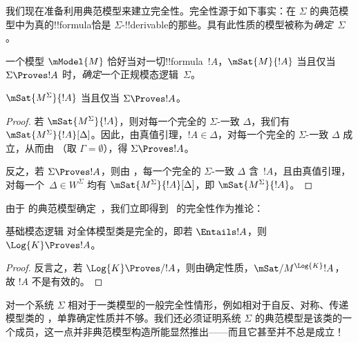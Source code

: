 \documentclass[../../../include/open-logic-section]{subfiles}
\begin{document}


我们现在准备利用典范模型来建立完全性。完全性源于如下事实：在 $\Sigma$ 的典范模型中为真的!!{formula}恰是 $\Sigma$-!!{derivable}的那些。具有此性质的模型被称为\emph{确定}~$\Sigma$。

\begin{defn}
  一个模型 $\mModel{M}$ 恰好当对一切!!{formula}~$!A$，$\mSat{M}{!A}$ 当且仅当 $\Sigma \Proves !A$ 时，\emph{确定}一个正规模态逻辑~$\Sigma$。
\end{defn}

\begin{thm}[确定]
   $\mSat{M^\Sigma}{!A}$ 当且仅当 $\Sigma \Proves !A$。
\end{thm}

\begin{proof}
  若 $\mSat{M^\Sigma}{!A}$，则对每一个完全的 $\Sigma$-一致 $\Delta$，我们有 $\mSat{M^\Sigma}{!A}[\Delta]$。因此，由真值引理，$!A \in \Delta$，对每一个完全的 $\Sigma$-一致 $\Delta$ 成立，从而由 （取 $\Gamma = \emptyset$），得 $\Sigma \Proves !A$。

  反之，若 $\Sigma \Proves !A$，则由 ，每一个完全的 $\Sigma$-一致 $\Delta$ 含~$!A$，且由真值引理，对每一个~$\Delta \in W^\Sigma$ 均有 $\mSat{M^\Sigma}{!A}[\Delta]$，即 $\mSat{M^\Sigma}{!A}$。
\end{proof}

由于  的典范模型确定~，我们立即得到~ 的完全性作为推论：

\begin{cor}
  基础模态逻辑  对全体模型类是完全的，即若 $\Entails !A$，则 $\Log{K} \Proves !A$。
\end{cor}

\begin{proof}
  反言之，若 $\Log{K} \Proves/ !A$，则由确定性质，$\mSat/{M^{\Log{K}}}{!A}$，故 $!A$ 不是有效的。
\end{proof}

对一个系统 $\Sigma$ 相对于一类模型的一般完全性情形，例如相对于自反、对称、传递模型类的 ，单靠确定性质并不够。我们还必须证明系统 $\Sigma$ 的典范模型是该类的一个成员，这一点并非典范模型构造所能显然推出——而且它甚至并不总是成立！
\end{document}
